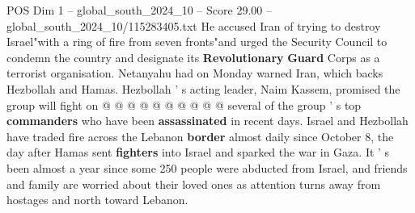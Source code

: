 \begin{textsample}{POS Dim 1 – global\_south\_2024\_10 – Score 29.00 – global\_south\_2024\_10/115283405.txt}
He accused Iran of trying to destroy Israel"with a ring of fire from seven fronts"and urged the Security Council to condemn the country and designate its \textbf{Revolutionary} \textbf{Guard} Corps as a terrorist organisation.
Netanyahu had on Monday warned Iran, which backs Hezbollah and Hamas.
Hezbollah ' s acting leader, Naim Kassem, promised the group will fight on @ @ @ @ @ @ @ @ @ @ several of the group ' s top \textbf{commanders} who have been \textbf{assassinated} in recent days.
Israel and Hezbollah have traded fire across the Lebanon \textbf{border} almost daily since October 8, the day after Hamas sent \textbf{fighters} into Israel and sparked the war in Gaza.
It ' s been almost a year since some 250 people were abducted from Israel, and friends and family are worried about their loved ones as attention turns away from hostages and north toward Lebanon.

\end{textsample}
